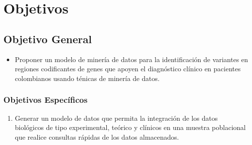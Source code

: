 \chapter{Objetivos}

\section{Objetivo General}

\begin{itemize}
	\item Proponer un modelo de miner\'ia de datos para la identificaci\'on de variantes en regiones codificantes de genes  que apoyen el  diagn\'ostico cl\'inico en pacientes colombianos usando t\'enicas de miner\'ia de datos.
\end{itemize}

\subsection{Objetivos Espec\'ificos}

\begin{enumerate}
	\item Generar un modelo de datos que permita la integraci\'on de los datos biol\'ogicos de tipo experimental, te\'orico y cl\'inicos en una  muestra poblacional que realice consultas r\'apidas de los datos almacenados.
	
\end{enumerate}





